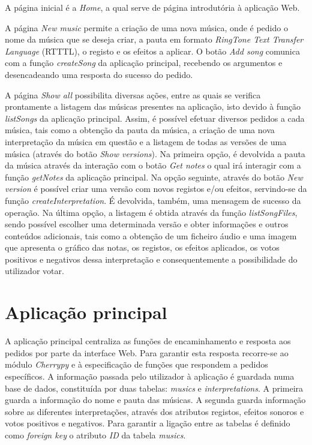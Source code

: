 \documentclass[11pt,openany,twoside]{report}
\begin{document}
A página inicial é a \textit{Home}, a qual serve de página introdutória à aplicação Web.

A página \textit{New music} permite a criação de uma nova música, onde é pedido o nome da música que se deseja criar, a pauta em formato \textit{RingTone
Text Transfer Language} (RTTTL), o registo e os efeitos a aplicar. O botão \textit{Add song} comunica com a função \textit{createSong} da aplicação principal, recebendo os argumentos e desencadeando uma resposta do sucesso do pedido.

A página \textit{Show all} possibilita diversas ações, entre as quais se verifica prontamente a listagem das músicas presentes na aplicação, isto devido à função \textit{listSongs} da aplicação principal. Assim, é possível efetuar diversos pedidos a cada música, tais como a obtenção da pauta da música, a criação de uma nova interpretação da música em questão e a listagem de todas as versões de uma música (através do botão \textit{Show versions}). Na primeira opção, é devolvida a pauta da música através da interação com o botão \textit{Get notes} o qual irá interagir com a função \textit{getNotes} da aplicação principal. Na opção seguinte, através do botão \textit{New version} é possível criar uma versão com novos registos e/ou efeitos, servindo-se da função \textit{createInterpretation}. É devolvida, também, uma mensagem de sucesso da operação. Na última opção, a listagem é obtida através da função \textit{listSongFiles}, sendo possível escolher uma determinada versão e obter informações e outros conteúdos adicionais, tais como a obtenção de um ficheiro áudio e uma imagem que apresenta o gráfico das notas, os registos, os efeitos aplicados, os votos positivos e negativos dessa interpretação e consequentemente a possibilidade do utilizador votar.

\section{Aplicação principal}
A aplicação principal centraliza as funções de encaminhamento e resposta aos pedidos por parte da interface Web. Para garantir esta resposta recorre-se ao módulo \textit{Cherrypy} e à especificação de funções que respondem a pedidos específicos. A informação passada pelo utilizador à aplicação é guardada numa base de dados, constituída por duas tabelas: \textit{musics} e \textit{interpretations}. A primeira guarda a informação do nome e pauta das músicas. A segunda guarda informação sobre as diferentes interpretações, através dos atributos registos, efeitos sonoros e votos positivos e negativos. Para garantir a ligação entre as tabelas é definido como \textit{foreign key} o atributo \textit{ID} da tabela \textit{musics}.
\end{document}
